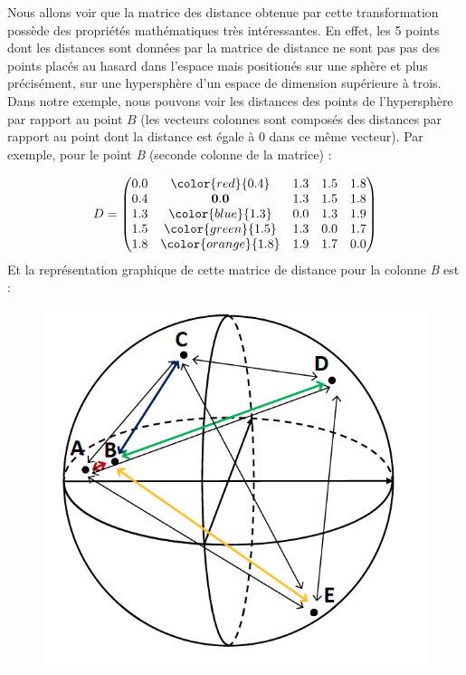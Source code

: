 Nous allons voir que la matrice des distance obtenue par cette transformation possède des propriétés mathématiques très intéressantes.\newline
En effet, les 5 points dont les distances sont données par la matrice de distance ne sont pas pas des points placés au hasard dans l'espace mais positionés sur une sphère et plus précisément, sur une hypersphère d'un espace de dimension supérieure à trois. Dans notre exemple, nous pouvons voir les distances des points de l'hypersphère par rapport au point $B$ (les vecteurs colonnes sont composés des distances par rapport au point dont la distance est égale à $0$ dans ce même vecteur). Par exemple, pour le point \textit{B} (seconde colonne de la matrice) : 

$$
D = \begin{pmatrix} 
0.0 & \color{red}{0.4} & 1.3 & 1.5 & 1.8 \\
0.4 & \mathbf{0.0} & 1.3 & 1.5 & 1.8 \\
1.3 & \color{blue}{1.3} & 0.0 & 1.3 & 1.9 \\
1.5 & \color{green}{1.5} & 1.3 & 0.0 & 1.7 \\
1.8 & \color{orange}{1.8} & 1.9 & 1.7 & 0.0
\end{pmatrix}
$$
Et la représentation graphique de cette matrice de distance pour la colonne \textit{B} est : 

\begin{figure}[H]\begin{center}\includegraphics[scale=0.45]{ilu/hyperB.png}\end{center}\end{figure}

